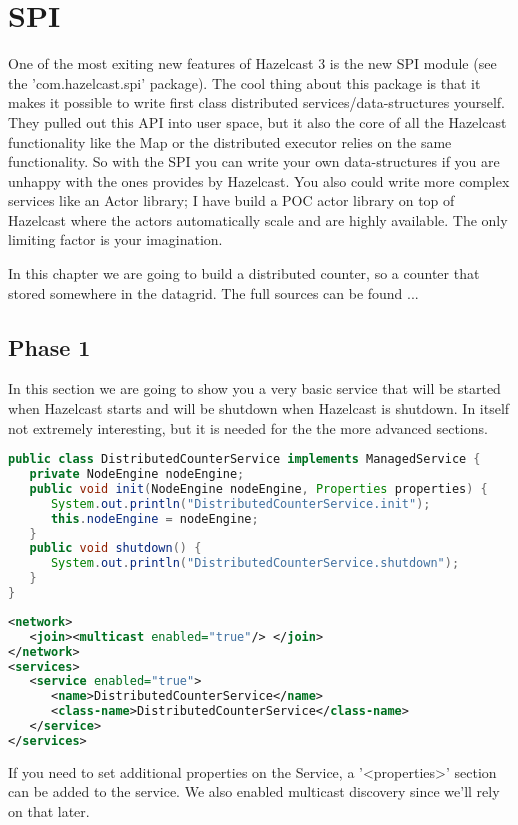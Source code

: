 \chapter{SPI}

One of the most exiting new features of Hazelcast 3 is the new SPI module (see the 'com.hazelcast.spi' package). The cool thing about this package is that it makes it possible to write first class distributed services/data-structures yourself. They pulled out this API into user space, but it also the core of all the Hazelcast functionality like the Map or the distributed executor relies on the same functionality. So with the SPI you can write your own data-structures if you are unhappy with the ones provides by Hazelcast. You also could write more complex services like an Actor library; I have build a POC actor library on top of Hazelcast where the actors automatically scale and are highly available. The only limiting factor is your imagination.

In this chapter we are going to build a distributed counter, so a counter that stored somewhere in the datagrid. The full sources can be found ...

\section{Phase 1}
In this section we are going to show you a very basic service that will be started when Hazelcast starts and will be shutdown when Hazelcast is shutdown. In itself not extremely interesting, but it is needed for the the more advanced sections.

\begin{lstlisting}[language=java]
public class DistributedCounterService implements ManagedService {
   private NodeEngine nodeEngine;
   public void init(NodeEngine nodeEngine, Properties properties) {
      System.out.println("DistributedCounterService.init");
      this.nodeEngine = nodeEngine;
   }
   public void shutdown() {
      System.out.println("DistributedCounterService.shutdown");
   }
}
\end{lstlisting}

\begin{lstlisting}[language=xml]
<network>
   <join><multicast enabled="true"/> </join>
</network>
<services>
   <service enabled="true">
      <name>DistributedCounterService</name>
      <class-name>DistributedCounterService</class-name>
   </service>
</services>
\end{lstlisting}
If you need to set additional properties on the Service, a '<properties>' section can be added to the service. We also enabled multicast discovery since we'll rely on that later.

